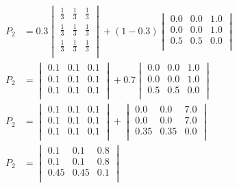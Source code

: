 \documentclass[12pt,english]{article}
\begin{document}
\begin{align*}
P_2 &=0.3
\begin{vmatrix}
\frac{1}{3} & \frac{1}{3} & \frac{1}{3}\\
\frac{1}{3} & \frac{1}{3} & \frac{1}{3}\\
\frac{1}{3} & \frac{1}{3} & \frac{1}{3}\\
\end{vmatrix}
+ (1-0.3)
\begin{vmatrix}
0.0 & 0.0 & 1.0\\
0.0 & 0.0 & 1.0\\
0.5 & 0.5 & 0.0\\
\end{vmatrix}
\\
P_2 &=
\begin{vmatrix}
0.1 & 0.1 & 0.1\\
0.1 & 0.1 & 0.1\\
0.1 & 0.1 & 0.1\\
\end{vmatrix}
+ 0.7
\begin{vmatrix}
0.0 & 0.0 & 1.0\\
0.0 & 0.0 & 1.0\\
0.5 & 0.5 & 0.0\\
\end{vmatrix}
\\
P_2 &=
\begin{vmatrix}
0.1 & 0.1 & 0.1\\
0.1 & 0.1 & 0.1\\
0.1 & 0.1 & 0.1\\
\end{vmatrix}
+ 
\begin{vmatrix}
0.0 & 0.0 & 7.0\\
0.0 & 0.0 & 7.0\\
0.35 & 0.35 & 0.0\\
\end{vmatrix}
\\
P_2 &=
\begin{vmatrix}
0.1 & 0.1 & 0.8\\
0.1 & 0.1 & 0.8\\
0.45 & 0.45 & 0.1\\
\end{vmatrix}
\end{align*}
\end{document}
